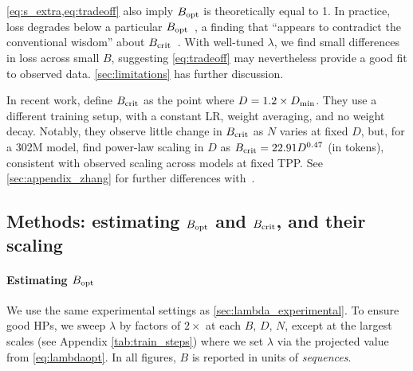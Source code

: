\cref{eq:s_extra,eq:tradeoff} also imply $B_{\text{opt}}$ is theoretically equal to 1.
In practice, loss degrades below a particular
$B_{\text{opt}}$~\citep{hu2024minicpm,bi2024deepseek,porian2024resolving}, a
finding that ``appears to contradict the conventional wisdom'' about
$B_{\text{crit}}$~\citep{porian2024resolving}.
%
With well-tuned $\lambda$, we find small differences in loss across
small $B$, suggesting \cref{eq:tradeoff} may nevertheless provide a
good fit to observed data. \cref{sec:limitations} has further
discussion.

In recent work,
\citet{zhang2024how} define $B_{\text{crit}}$ as the point where \mbox{$D = 1.2 \times D_{\text{min}}$}.
They use a different training setup,
with a constant LR, weight averaging, and no weight decay.  Notably,
they observe little change in $B_{\text{crit}}$ as $N$ varies at fixed $D$,
but, for a 302M model, find power-law scaling in $D$ as
\mbox{$B_{\text{crit}} = 22.91 D^{0.47}$} (in tokens),
consistent with observed scaling across models at fixed TPP\@.
See \cref{sec:appendix_zhang} for further differences
with~\citet{zhang2024how}.

\subsection{Methods: estimating $B_{\text{opt}}$ and $B_{\text{crit}}$, and their scaling}\label{sec:cbs_methods}

\begin{figure}
  \noindent
\begin{minipage}[b]{0.32\textwidth}
  \centering
  
\end{minipage}%
\hfill
\begin{minipage}[b]{0.64\textwidth}
  \centering
  
\end{minipage}
\end{figure}

\paragraph{Estimating $B_{\text{opt}}$}

We use the same experimental settings as \cref{sec:lambda_experimental}.
%
%
To ensure good HPs, we sweep $\lambda$ by factors of $2\times$ at each
$B$, $D$, $N$, except at the largest scales (see
Appendix \cref{tab:train_steps}) where we set $\lambda$ via the
projected value from \cref{eq:lambdaopt}.
%
In all figures, $B$ is reported in units of \emph{sequences}.


